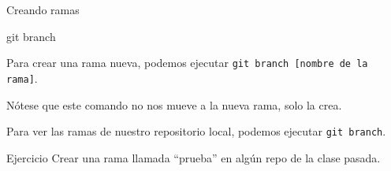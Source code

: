 \begin{frame}[t]{Creando ramas}
    \begin{comando}
        git branch
    \end{comando}

    \pause
    \begin{block}{}
        Para crear una rama nueva, podemos ejecutar \texttt{git branch [nombre de la rama]}.

        \vspace{.4em}

        Nótese que este comando no nos mueve a la nueva rama, solo la crea.

        \vspace{.4em}

        Para ver las ramas de nuestro repositorio local, podemos ejecutar \texttt{git branch}.
    \end{block}

    \pause
    \begin{ejercicio}{Ejercicio}
        Crear una rama llamada ``prueba'' en algún repo de la clase pasada.
    \end{ejercicio}

\end{frame}

